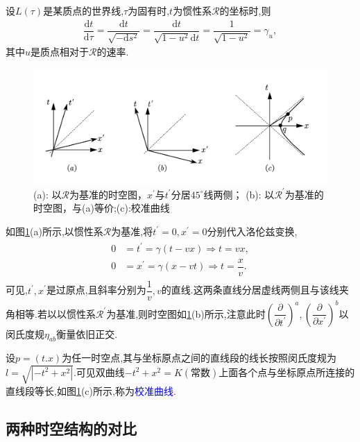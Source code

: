 设$L(\tau)$是某质点的世界线,$\tau$为固有时,$t$为惯性系$\mathscr{R}$的坐标时,则
\begin{align}
    \dfrac{\text{d}t}{\text{d}\tau}= \dfrac{\text{d}t}{\sqrt{-\text{d}s^2}}= \dfrac{\text{d}t}{\sqrt{1-u^2}\text{d}t}=\dfrac{1}{\sqrt{1-u^2}}=\gamma_u,
\end{align}
其中$u$是质点相对于$\mathscr{R}$的速率.

\begin{figure}[htbp]
    \centering
    \includegraphics[width=\textwidth]{Pictures/6-6.png}
    \caption{(a): 以$\mathscr{R}$为基准的时空图，$x^\prime$与$t^\prime$分居$45^\circ$线两侧；
    (b): 以$\mathscr{R}^\prime$为基准的时空图，与(a)等价;(c):校准曲线}
    \label{fig:6-6}
\end{figure}

如图\ref{fig:6-6}(a)所示,以惯性系$\mathscr{R}$为基准,将$t^\prime=0,x^\prime=0$分别代入洛伦兹变换,
\begin{align}
\begin{aligned}
    0&=t^\prime=\gamma(t-vx)\Rightarrow t=vx,\\
 0&=x^\prime=\gamma(x-vt)\Rightarrow t=\dfrac{x}{v}.
\end{aligned}
\end{align}
可见,$t^\prime,x^\prime$是过原点,且斜率分别为$\dfrac{1}{v},v$的直线.这两条直线分居虚线两侧且与该线夹角相等.若以以惯性系$\mathscr{R}^\prime$为基准,则时空图如\ref{fig:6-6}(b)所示,注意此时$\left(\dfrac{\partial}{\partial t^\prime}\right)^a,\left(\dfrac{\partial}{\partial x^\prime}\right)^b$以闵氏度规$\eta_{ab}$衡量依旧正交.

设$p=(t.x)$为任一时空点,其与坐标原点之间的直线段的线长按照闵氏度规为$l=\sqrt{|-t^2+x^2|}$.可见双曲线$-t^2+x^2=K(\text{常数})$上面各个点与坐标原点所连接的直线段等长,如图\ref{fig:6-6}(c)所示,称为\textcolor{blue}{校准曲线}.

\subsection{两种时空结构的对比}

